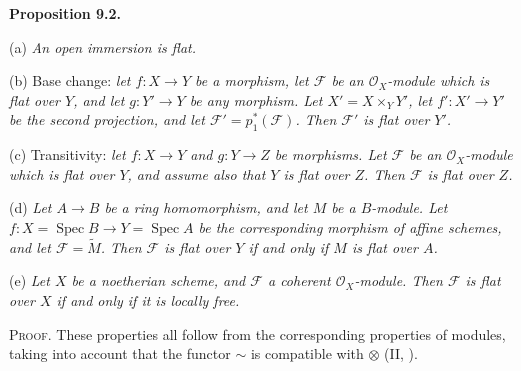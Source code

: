 {\medskip
\noindent\hypertarget{result-III-9.2}{}\textbf{Proposition 9.2.}

\noindent\hspace*{1.7em}\hypertarget{result-III-9.2-a}{}(a) \emph{An open immersion is flat.}

\noindent\hspace*{1.7em}\hypertarget{result-III-9.2-b}{}(b) Base change: \emph{let $f\colon X\to Y$ be a morphism, let $\mathcal F$ be an $\mathcal O_X$-module which is flat over $Y$, and let $g\colon Y'\to Y$ be any morphism. Let $X'=X\times_Y Y'$, let $f'\colon X'\to Y'$ be the second projection, and let $\mathcal F'=p_1^*(\mathcal F)$. Then $\mathcal F'$ is flat over $Y'$.}

\noindent\hspace*{1.7em}\hypertarget{result-III-9.2-c}{}(c) Transitivity: \emph{let $f\colon X\to Y$ and $g\colon Y\to Z$ be morphisms. Let $\mathcal F$ be an $\mathcal O_X$-module which is flat over $Y$, and assume also that $Y$ is flat over $Z$. Then $\mathcal F$ is flat over $Z$.}

\noindent\hspace*{1.7em}\hypertarget{result-III-9.2-d}{}(d) \emph{Let $A\to B$ be a ring homomorphism, and let $M$ be a $B$-module. Let $f\colon X=\operatorname{Spec}B\to Y=\operatorname{Spec}A$ be the corresponding morphism of affine schemes, and let $\mathcal F=\widetilde M$. Then $\mathcal F$ is flat over $Y$ if and only if $M$ is flat over $A$.}

\noindent\hspace*{1.7em}\hypertarget{result-III-9.2-e}{}(e) \emph{Let $X$ be a noetherian scheme, and $\mathcal F$ a coherent $\mathcal O_X$-module. Then $\mathcal F$ is flat over $X$ if and only if it is locally free.}

\smallskip
\noindent\textsc{Proof.} These properties all follow from the corresponding properties of modules, taking into account that the functor $\sim$ is compatible with $\otimes$ (II, ).}
